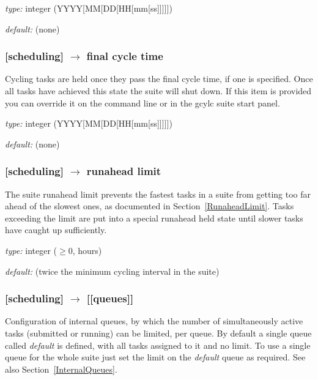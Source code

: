 \begin{myitemize}
    \item {\em type:} integer (YYYY[MM[DD[HH[mm[ss]]]]])
    \item {\em default:} (none)
\end{myitemize}

\subsubsection[final cycle time]{[scheduling] $\rightarrow$ final cycle time}

Cycling tasks are held once they pass the final cycle time, if one is
specified. Once all tasks have achieved this state the suite will shut
down. If this item is provided you can override it on the command line
or in the gcylc suite start panel.

\begin{myitemize}
    \item {\em type:} integer (YYYY[MM[DD[HH[mm[ss]]]]])
    \item {\em default:} (none)
\end{myitemize}

\subsubsection[runahead limit]{[scheduling] $\rightarrow$ runahead limit}

The suite runahead limit prevents the fastest tasks in a suite from
getting too far ahead of the slowest ones, as documented in
Section~\ref{RunaheadLimit}. Tasks exceeding the limit are put into
a special runahead held state until slower tasks have caught up
sufficiently. 
\begin{myitemize}
    \item {\em type:} integer ($\geq 0$, hours)
    \item {\em default:} (twice the minimum cycling interval in the suite)
\end{myitemize}

\subsubsection[{[[}queues{]]}]{[scheduling] $\rightarrow$ [[queues]]}

Configuration of internal queues, by which the number of simultaneously
active tasks (submitted or running) can be limited, per queue. By
default a single queue called {\em default} is defined, with all tasks 
assigned to it and no limit. To use a single queue for the whole suite 
just set the limit on the {\em default} queue as required.
See also Section~\ref{InternalQueues}.

